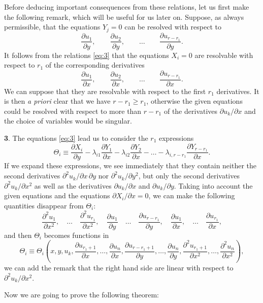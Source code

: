 \documentclass[leqno,11pt]{article}
\newcommand{\pd}{\partial}
\theoremstyle{shape1}
\theoremstyle{shape0}
\theoremstyle{shape2}
\theoremstyle{definition}
\begin{document}
Before deducing important consequences from these relations, let us first make the following remark, which will be useful for us later on. Suppose, as always permissible, that the equations $Y_{j}=0$ can be resolved with respect to
\[
\frac{\pd u_{1}}{\pd y},\qquad\frac{\pd u_{2}}{\pd y},\qquad\dots\qquad\frac{\pd u_{r-r_{1}}}{\pd y}.
\]
It follows from the relations \eqref{eq:3} that the equations $X_{i}=0$ are resolvable with respect to $r_{1}$ of the corresponding derivatives
\[
\frac{\pd u_{1}}{\pd x},\qquad\frac{\pd u_{2}}{\pd x},\qquad\dots\qquad\frac{\pd u_{r-r_{1}}}{\pd x}.
\]
We can suppose that they are resolvable with respect to the first $r_{1}$ derivatives. It is then \emph{a priori} clear that we have $r-r_{1}\ge r_{1}$, otherwise the given equations could be resolved with respect to more than $r-r_{1}$ of the derivatives $\pd u_{k}/\pd x$ and the choice of variables would be singular.

\vspace{12pt}

\textbf{3}. The equations \eqref{eq:3} lead us to consider the $r_{1}$ expressions
\begin{equation}
  \label{eq:4}
  \Theta_{i}\equiv\frac{\pd X_{i}}{\pd y}-\lambda_{i1}\frac{\pd Y_{1}}{\pd x}-\lambda_{i2}\frac{\pd Y_{2}}{\pd x}-\dots-\lambda_{i,r-r_{1}}\frac{\pd Y_{r-r_{1}}}{\pd x}.
\end{equation}
If we expand these expressions, we see immediately that they contain neither the second derivatives $\pd^{2}u_{k}/\pd x\,\pd y$ nor $\pd^{2}u_{k}/\pd y^{2}$, but only the second derivatives $\pd^{2}u_{k}/\pd x^{2}$ as well as the derivatives $\pd u_{k}/\pd x$ and $\pd u_{k}/\pd y$. Taking into account the given equations and the equations $\pd X_{i}/\pd x=0$, we can make the following quantities disappear from $\Theta_{i}$:
\[
\frac{\pd^{2}u_{1}}{\pd x^{2}},\quad\dots\quad\frac{\pd^{2}u_{r_{1}}}{\pd x^{2}},\quad\frac{\pd u_{1}}{\pd y}\quad\dots\quad\frac{\pd u_{r-r_{1}}}{\pd y},\quad\frac{\pd u_{1}}{\pd x},\quad\dots\quad\frac{\pd u_{r_{1}}}{\pd x},
\]
and then $\Theta_{i}$ becomes functions in
\[
\Theta_{i}\equiv\Theta_{i}\left(x,y,u_{k},\frac{\pd u_{r_{1}+1}}{\pd x},\dots,\frac{\pd u_{n}}{\pd x},\frac{\pd u_{r-r_{1}+1}}{\pd y},\dots,\frac{\pd u_{n}}{\pd y},\frac{\pd ^{2}u_{r_{1}+1}}{\pd x^{2}},\dots,\frac{\pd^{2}u_{n}}{\pd x^{2}}\right),
\]
we can add the remark that the right hand side are linear with respect to $\pd^{2}u_{k}/\pd x^{2}$.

Now we are going to prove the following theorem:
\end{document}
